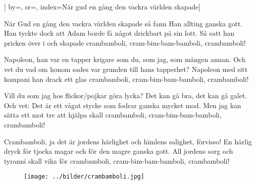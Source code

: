 

[ 		%
	by={},					%
	sr={},					%
	index={När gud en gång den vackra världen skapade}]						%



\beginverse*						%
När Gud en gång den vackra världen skapade
så fann Han allting ganska gott.
Han tyckte dock att Adam borde
få något drickbart på sin lott.
Så satt han pricken över i
och skapade crambamboli,
cram-bim-bam-bamboli,
crambamboli!
\endverse							%

\beginverse*						%
Napoleon, han var en tapper krigare
som du, som jag, som mången annan.
Och vet du vad om honom sades
var grunden till hans tapperhet?
Napoleon med sitt kompani
han drack ett glas crambamboli,
cram-bim-bam-bamboli,
crambamboli!
\endverse							%


\beginverse*						%
Vill du som jag hos flickor/pojkar göra lycka?
Det kan gå bra, det kan gå galet.
Och vet: Det är ett vågat stycke
som fodrar ganska mycket mod.
Men jag kan sätta ett mot tre
att hjälpa skall crambamboli,
cram-bim-bam-bamboli,
crambamboli!
\endverse							%


\beginverse*						%
Crambamboli, ja det är jordens härlighet
och himlens salighet, förvisso!
En härlig dryck för tjocka magar
och för den magre ganska gott.
All jordens sorg och tyranni
skall vika för crambamboli,
cram-bim-bam-bamboli,
crambamboli!
\endverse							%
\endsong							%

\begin{figure}[!b]
\begin{center}
\texttt{[image: ../bilder/crambamboli.jpg]} 
\end{center}
\end{figure}